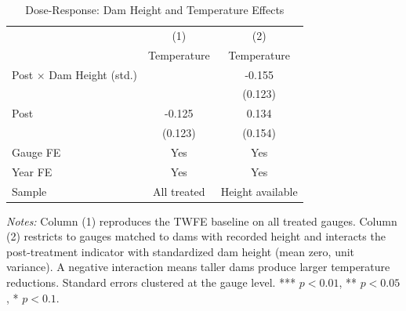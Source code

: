\begin{table}[t]
\centering
\caption{Dose-Response: Dam Height and Temperature Effects}
\label{tab:dose}
\begin{tabular}{lcc}
\hline\hline
 & (1) & (2) \\
 & Temperature & Temperature \\
\hline
Post $\times$ Dam Height (std.) & & -0.155 \\
 & & (0.123) \\
Post & -0.125 & 0.134 \\
 & (0.123) & (0.154) \\
\hline
Gauge FE & Yes & Yes \\
Year FE & Yes & Yes \\
Sample & All treated & Height available \\
\hline\hline
\end{tabular}
\begin{tablenotes}
\small
\item \textit{Notes:} Column (1) reproduces the TWFE baseline on all treated gauges. Column (2) restricts to gauges matched to dams with recorded height and interacts the post-treatment indicator with standardized dam height (mean zero, unit variance). A negative interaction means taller dams produce larger temperature reductions. Standard errors clustered at the gauge level. *** $p<0.01$, ** $p<0.05$, * $p<0.1$.
\end{tablenotes}
\end{table}


